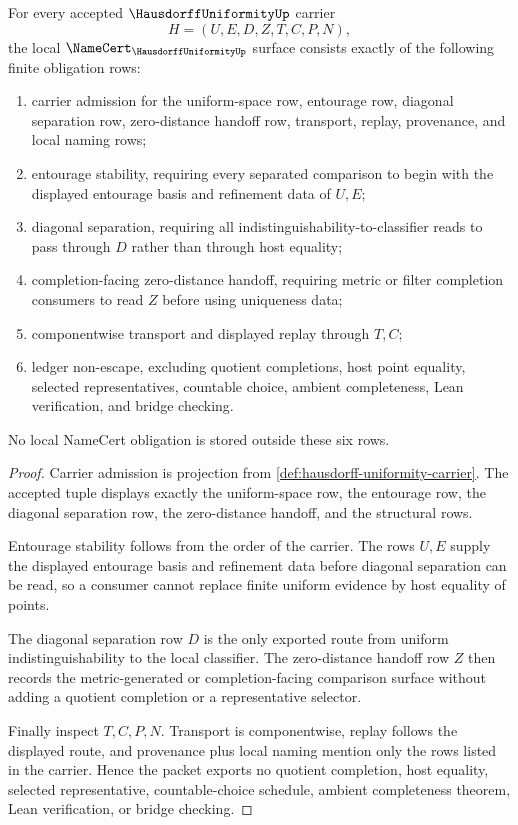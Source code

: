 \begin{theorem}
\label{thm:hausdorff-uniformity-namecert-obligations}
For every accepted $\HausdorffUniformityUp$ carrier
$$
H=(U,E,D,Z,T,C,P,N),
$$
the local $\NameCert_{\HausdorffUniformityUp}$ surface consists exactly of the following finite obligation rows:
\begin{enumerate}
\item carrier admission for the uniform-space row, entourage row, diagonal separation row, zero-distance handoff row, transport, replay, provenance, and local naming rows;
\item entourage stability, requiring every separated comparison to begin with the displayed entourage basis and refinement data of $U,E$;
\item diagonal separation, requiring all indistinguishability-to-classifier reads to pass through $D$ rather than through host equality;
\item completion-facing zero-distance handoff, requiring metric or filter completion consumers to read $Z$ before using uniqueness data;
\item componentwise transport and displayed replay through $T,C$;
\item ledger non-escape, excluding quotient completions, host point equality, selected representatives, countable choice, ambient completeness, Lean verification, and bridge checking.
\end{enumerate}
No local NameCert obligation is stored outside these six rows.
\end{theorem}
\begin{proof}
Carrier admission is projection from \autoref{def:hausdorff-uniformity-carrier}. The accepted tuple displays exactly the uniform-space row, the entourage row, the diagonal separation row, the zero-distance handoff, and the structural rows.

Entourage stability follows from the order of the carrier. The rows $U,E$ supply the displayed entourage basis and refinement data before diagonal separation can be read, so a consumer cannot replace finite uniform evidence by host equality of points.

The diagonal separation row $D$ is the only exported route from uniform indistinguishability to the local classifier. The zero-distance handoff row $Z$ then records the metric-generated or completion-facing comparison surface without adding a quotient completion or a representative selector.

Finally inspect $T,C,P,N$. Transport is componentwise, replay follows the displayed route, and provenance plus local naming mention only the rows listed in the carrier. Hence the packet exports no quotient completion, host equality, selected representative, countable-choice schedule, ambient completeness theorem, Lean verification, or bridge checking.
\end{proof}

